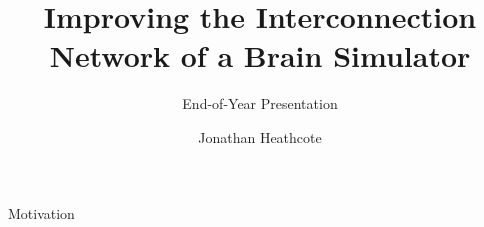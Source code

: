 \documentclass[t]{beamer}
\title{Improving the Interconnection Network of a Brain Simulator}
\subtitle{End-of-Year Presentation}
\author{Jonathan Heathcote}
\date{}
\begin{document}
	
	\maketitle
	
	\begin{frame}{Motivation}
		
	\end{frame}
	
\end{document}
